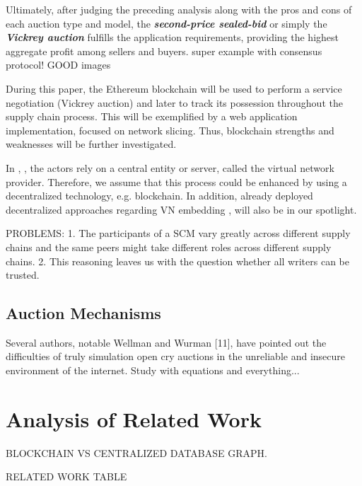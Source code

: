 Ultimately, after judging the preceding analysis along with the pros and cons of each auction type and model, the \textbf{\textit{second-price sealed-bid}} or simply the \textbf{\textit{Vickrey auction}} fulfills the application requirements, providing the highest aggregate profit among sellers and buyers.
\citep{esposito2013general} super example with consensus protocol! GOOD images

 During this paper, the Ethereum blockchain will be used to perform a service negotiation (Vickrey auction) and later to track its possession throughout the supply chain process. This will be exemplified by a web application implementation, focused on network slicing. Thus, blockchain strengths and weaknesses will be further investigated.
 
In \citep{dietrich2017multi}, \citep{zaheer2010multi}, the actors rely on a central entity or server, called the virtual network provider. Therefore, we assume that this process could be enhanced by using a decentralized technology, e.g. blockchain. In addition, already deployed decentralized approaches regarding VN embedding \citep{esposito2013general}, \citep{chowdhury2010polyvine} will also be in our spotlight.

PROBLEMS: 1. The participants of a SCM vary greatly across different supply
chains and the same peers might take different roles across different supply chains. 2. This reasoning leaves us with the question whether all writers
can be trusted. 
 
\subsection{Auction Mechanisms}

Several authors, notable Wellman and Wurman [11], have pointed out the difficulties of truly simulation open cry auctions in the unreliable and insecure environment of the internet.
Study \citep{ausubel2006lovely} with equations and everything...


\section{Analysis of Related Work}

BLOCKCHAIN VS CENTRALIZED DATABASE GRAPH.

RELATED WORK TABLE

